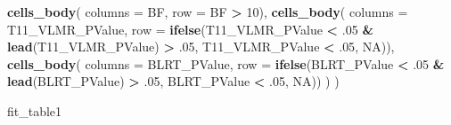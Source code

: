 \documentclass[
]{book}
\newenvironment{Shaded}{\begin{snugshade}}{\end{snugshade}}
\newcommand{\AttributeTok}[1]{\textcolor[rgb]{0.13,0.29,0.53}{#1}}
\newcommand{\ConstantTok}[1]{\textcolor[rgb]{0.56,0.35,0.01}{#1}}
\newcommand{\DecValTok}[1]{\textcolor[rgb]{0.00,0.00,0.81}{#1}}
\newcommand{\FunctionTok}[1]{\textcolor[rgb]{0.13,0.29,0.53}{\textbf{#1}}}
\newcommand{\NormalTok}[1]{#1}
\newcommand{\SpecialCharTok}[1]{\textcolor[rgb]{0.81,0.36,0.00}{\textbf{#1}}}
\begin{document}
\begin{Shaded}
\begin{Highlighting}[]
    \FunctionTok{cells\_body}\NormalTok{(}
     \AttributeTok{columns =}\NormalTok{ BF,}
     \AttributeTok{row =}\NormalTok{  BF }\SpecialCharTok{\textgreater{}} \DecValTok{10}\NormalTok{),}
    \FunctionTok{cells\_body}\NormalTok{( }
     \AttributeTok{columns =}\NormalTok{  T11\_VLMR\_PValue,}
     \AttributeTok{row =}  \FunctionTok{ifelse}\NormalTok{(T11\_VLMR\_PValue }\SpecialCharTok{\textless{}}\NormalTok{ .}\DecValTok{05} \SpecialCharTok{\&} \FunctionTok{lead}\NormalTok{(T11\_VLMR\_PValue) }\SpecialCharTok{\textgreater{}}\NormalTok{ .}\DecValTok{05}\NormalTok{, T11\_VLMR\_PValue }\SpecialCharTok{\textless{}}\NormalTok{ .}\DecValTok{05}\NormalTok{, }\ConstantTok{NA}\NormalTok{)),}
    \FunctionTok{cells\_body}\NormalTok{(}
     \AttributeTok{columns =}\NormalTok{  BLRT\_PValue,}
     \AttributeTok{row =}  \FunctionTok{ifelse}\NormalTok{(BLRT\_PValue }\SpecialCharTok{\textless{}}\NormalTok{ .}\DecValTok{05} \SpecialCharTok{\&} \FunctionTok{lead}\NormalTok{(BLRT\_PValue) }\SpecialCharTok{\textgreater{}}\NormalTok{ .}\DecValTok{05}\NormalTok{, BLRT\_PValue }\SpecialCharTok{\textless{}}\NormalTok{ .}\DecValTok{05}\NormalTok{, }\ConstantTok{NA}\NormalTok{))}
\NormalTok{  )}
\NormalTok{)}

\NormalTok{fit\_table1}
\end{Highlighting}
\end{Shaded}
\end{document}
